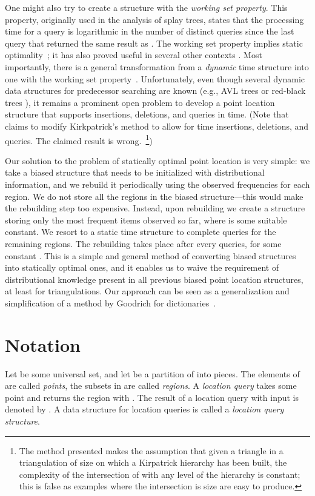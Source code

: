 \documentclass[11pt]{article}
\begin{document}
One might also try to create a structure with the 
\emph{working set property}. This property, 
originally used in the analysis of splay
trees, states that the processing time for a query  is logarithmic
in the number
of distinct queries since the last query that returned the same result
as . 
The working set property implies static 
optimality~\cite{Iacono01a}; 
it has also proved useful in several other
contexts \cite{BoseDoDuHo10,Elmasry06,BoseDoLa08,Iacono05,Iacono00}. 
Most importantly, there is a general
transformation from a \emph{dynamic}  time 
structure into one with the working
set property~\cite{Iacono01a}. 
Unfortunately, even though several dynamic data structures for 
predecessor searching are known (e.g., AVL trees \cite{avl} or
red-black trees \cite{redblack}), it remains a prominent open problem
to develop a point location structure that supports insertions, deletions,
and queries in  time.
(Note that \cite{Talib:1996:TME:792755.792810} claims to modify Kirkpatrick's
method to allow for  time insertions, deletions, and queries. The
claimed result is wrong.~\footnote{The method presented makes the assumption 
that given a triangle  in a triangulation of size  on which
a Kirpatrick hierarchy has been built, the complexity of the 
intersection of  with any level of the hierarchy is constant; this is 
false as examples where the intersection is size  are easy to produce.})

Our solution to the problem of statically optimal point location is
very simple: we take a biased structure that needs to be initialized with
distributional information, and we rebuild it periodically using the observed
frequencies for each region. We do not store all the regions in the biased
structure---this would make the rebuilding step too expensive.
Instead, upon rebuilding we create a structure storing only the  most
frequent items observed so far,
where  is some suitable constant.
We resort to a static
 time structure to
complete queries for the remaining regions.
 The rebuilding takes place after every  queries, for some constant
.
This is a
simple and general method of converting biased structures into statically
optimal ones, and it enables us to waive the requirement of
distributional knowledge present in all previous biased point location
structures, at least for triangulations.
Our approach can be seen as a generalization and simplification of a method
by Goodrich for dictionaries~\cite{Goodrich00}.

\section{Notation}
Let  be some universal set, and let  be a
partition of  into  pieces. The elements
of  are called \emph{points}, the subsets in  are called \emph{regions}.
A \emph{location query} takes some point  and
returns the region  with . The result
of a location query with input  is denoted by .
A data structure for location queries is called a \emph{location
query structure}. 
\end{document}
